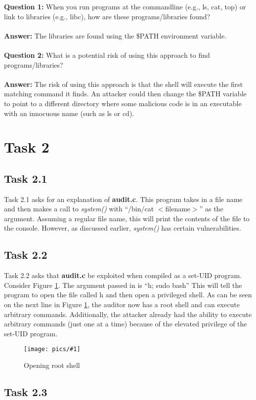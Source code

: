 \documentclass[11pt]{article}
\newcommand{\fig}[2]{ 
\begin{figure}[h]
	\centering
	\caption{#2}
	\texttt{[image: pics/\#1]}
	\label{fig:#1}
\end{figure} 
}
\newcommand{\sys}{\textit{system()} }
\newcommand{\aud}{\textbf{audit.c} }
\begin{document}
\textbf{Question 1: } When you run programs at the commandline (e.g., ls, cat, top) or link to libraries (e.g., libc), how are these programs/libraries found? \\\\
\textbf{Answer: } The libraries are found using the \$PATH environment variable. \\\\
\textbf{Question 2: } What is a potential risk of using this approach to find programs/libraries? \\\\
\textbf{Answer: } The risk of using this approach is that the shell will execute the first matching command it finds. An attacker could then change the \$PATH variable to point to a different directory where some malicious code is in an executable with an innocuous name (such as ls or cd).

\newpage
\section*{Task 2}

\subsection*{Task 2.1}
Task 2.1 asks for an explanation of \textbf{audit.c}. This program takes in a file name and then makes a call to \sys with ``/bin/cat $<$filename$>$'' as the argument. Assuming a regular file name, this will print the contents of the file to the console. However, as discussed earlier, \sys has certain vulnerabilities.

\subsection*{Task 2.2}

Task 2.2 asks that \aud be exploited when compiled as a set-UID program. Consider Figure \ref{fig:task2.2}. The argument passed in is ``h; sudo bash'' This will tell the program to open the file called h and then open a privileged shell. As can be seen on the next line in Figure \ref{fig:task2.2}, the auditor now has a root shell and can execute arbitrary commands. Additionally, the attacker already had the ability to execute arbitrary commands (just one at a time) because of the elevated privilege of the set-UID program.

\fig{task2.2}{Opening root shell}

\subsection*{Task 2.3}
\end{document}
